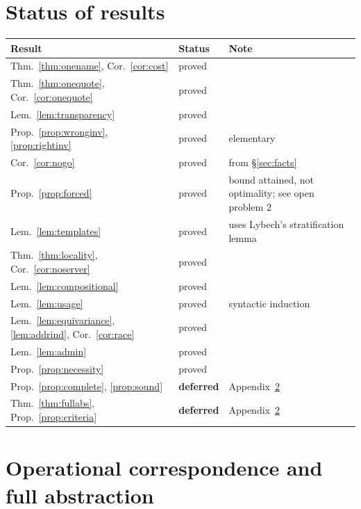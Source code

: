 \documentclass[11pt]{article}
\theoremstyle{definition}
\theoremstyle{plain}
\theoremstyle{remark}
\begin{document}
\appendix

\section{Status of results}\label{app:status}

\begin{center}
\begin{tabular}{@{}llp{}@{}}
\toprule
Result & Status & Note \\
\midrule
Thm.~\ref{thm:onename}, Cor.~\ref{cor:cost} & proved & \\
Thm.~\ref{thm:onequote}, Cor.~\ref{cor:onequote} & proved & \\
Lem.~\ref{lem:transparency} & proved & \\
Prop.~\ref{prop:wronginv}, \ref{prop:rightinv} & proved & elementary \\
Cor.~\ref{cor:nogo} & proved & from \S\ref{sec:facts} \\
Prop.~\ref{prop:forced} & proved & bound attained, not optimality; see open problem 2 \\
Lem.~\ref{lem:templates} & proved & uses Lybech's stratification lemma \\
Thm.~\ref{thm:locality}, Cor.~\ref{cor:noserver} & proved & \\
Lem.~\ref{lem:compositional} & proved & \\
Lem.~\ref{lem:usage} & proved & syntactic induction \\
Lem.~\ref{lem:equivariance}, \ref{lem:addrind}, Cor.~\ref{cor:race} & proved & \\
Lem.~\ref{lem:admin} & proved & \\
Prop.~\ref{prop:necessity} & proved & \\
Prop.~\ref{prop:complete}, \ref{prop:sound} & \textbf{deferred} & Appendix~\ref{app:proofs} \\
Thm.~\ref{thm:fullabs}, Prop.~\ref{prop:criteria} & \textbf{deferred} & Appendix~\ref{app:proofs} \\
\bottomrule
\end{tabular}
\end{center}

\section{Operational correspondence and full abstraction}\label{app:proofs}
\end{document}
